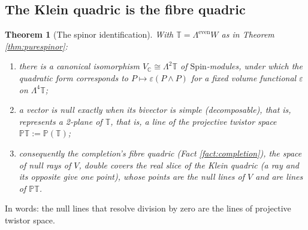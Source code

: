\documentclass[11pt]{article}
\newtheorem{theorem}{Theorem}[section]
\theoremstyle{definition}
\newcommand{\C}{\mathbb{C}}
\newcommand{\T}{\mathbb{T}}
\newcommand{\PT}{\mathbb{PT}}
\begin{document}
\subsection{The Klein quadric is the fibre quadric}\label{subsec:klein}

\begin{theorem}[The spinor identification]\label{thm:spinorid}
With $\T = \Lambda^{\mathrm{even}} W$ as in Theorem \ref{thm:purespinor}:
\begin{enumerate}
\item there is a canonical isomorphism $V_\C \cong \Lambda^2 \T$ of $\mathrm{Spin}$-modules, under which the quadratic form corresponds to $P \mapsto \varepsilon(P \wedge P)$ for a fixed volume functional $\varepsilon$ on $\Lambda^4\T$;
\item a vector is null exactly when its bivector is simple (decomposable), that is, represents a 2-plane of $\T$, that is, a line of the projective twistor space $\PT := \mathbb{P}(\T)$;
\item consequently the completion's fibre quadric (Fact \ref{fact:completion}), the space of null rays of $V$, double covers the real slice of the Klein quadric (a ray and its opposite give one point), whose points are the null lines of $V$ and are lines of $\PT$.
\end{enumerate}
\end{theorem}

In words: the null lines that resolve division by zero are the lines of projective twistor space.
\end{document}
